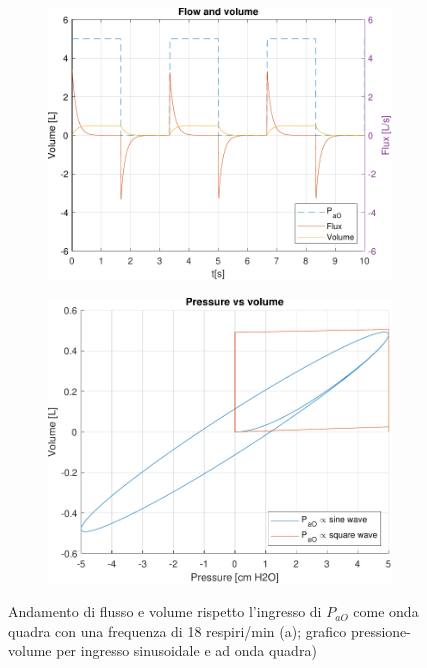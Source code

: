 \begin{figure}[t!]
	\begin{subfigure}{0.5\linewidth}
		\centering
		\includegraphics[width=0.95\linewidth]{../model/data_log/data_square_wave_freq_18.pdf}
		\caption{}
	\end{subfigure}\hfill
	\begin{subfigure}{0.5\linewidth}
		\centering
		\includegraphics[width=0.95\linewidth]{../model/data_log/PV_sine_vs_square.pdf}
		\caption{}
	\end{subfigure}
	\caption{Andamento di flusso e volume rispetto l'ingresso di $P_{aO}$ come onda quadra con una frequenza di 18 respiri/min (a); grafico pressione-volume per ingresso sinusoidale e ad onda quadra)}
	\label{fig:square_wave_45}
\end{figure}

